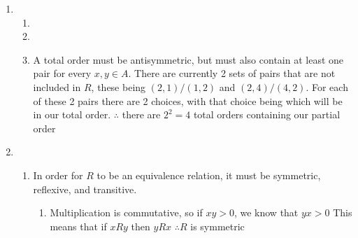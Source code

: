 \documentclass{article}
\begin{document}
\begin{enumerate}
		\item 
		\begin{enumerate}
			\item \mbox{}
			\newline
			
			\item \mbox{}
			\newline
			
			\newpage
			\item A total order must be antisymmetric, but must also contain at least one pair for every $x,y\in A$. There are currently 2 sets of pairs that are not included in $R$, these being $(2,1)/(1,2)$ and $(2,4)/(4,2)$.
			\newline For each of these 2 pairs there are 2 choices, with that choice being which will be in our total order.
			\newline $\therefore$ there are $2^2=4$ total orders containing our partial order
		\end{enumerate}
	
		\item
		\begin{enumerate}
			\item In order for $R$ to be an equivalence relation, it must be symmetric, reflexive, and transitive.
			\begin{enumerate}
				\item Multiplication is commutative, so if $xy>0$, we know that $yx>0$
				\newline This means that if $xRy$ then $yRx$
				\newline $\therefore R$ is symmetric
				

\end{enumerate}
\end{enumerate}
\end{enumerate}
\end{document}
